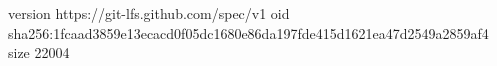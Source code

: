 version https://git-lfs.github.com/spec/v1
oid sha256:1fcaad3859e13ecacd0f05dc1680e86da197fde415d1621ea47d2549a2859af4
size 22004
